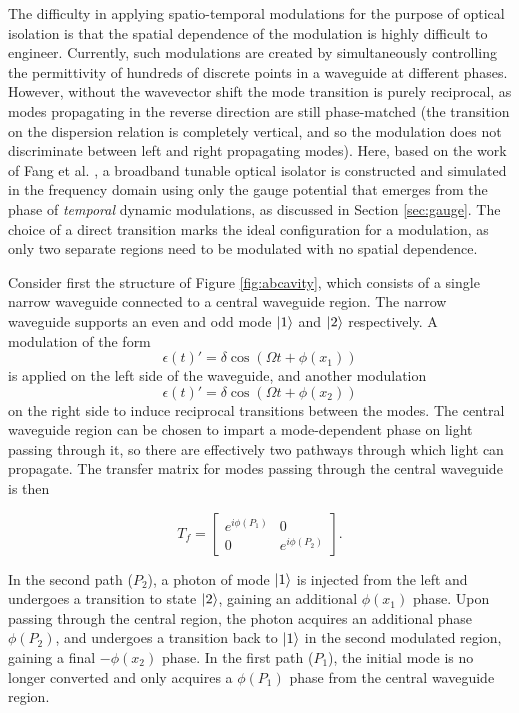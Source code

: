 The difficulty in applying spatio-temporal modulations for the purpose of optical isolation is that the spatial dependence of the modulation is highly difficult to engineer. Currently, such modulations are created by simultaneously controlling the permittivity of hundreds of discrete points in a waveguide at different phases. However, without the wavevector shift the mode transition is purely reciprocal, as modes propagating in the reverse direction are still phase-matched (the transition on the dispersion relation is completely vertical, and so the modulation does not discriminate between left and right propagating modes). Here, based on the work of Fang et al. \cite{Fang2012}, a broadband tunable optical isolator is constructed and simulated in the frequency domain using only the gauge potential that emerges from the phase of \textit{temporal} dynamic modulations, as discussed in Section \ref{sec:gauge}. The choice of a direct transition marks the ideal configuration for a modulation, as only two separate regions need to be modulated with no spatial dependence.

Consider first the structure of Figure \ref{fig:abcavity}, which consists of a single narrow waveguide connected to a central waveguide region. The narrow waveguide supports an even and odd mode $\ket{1}$ and $\ket{2}$ respectively. A modulation of the form
\begin{equation}
\epsilon(t)' = \delta \cos (\Omega t + \phi(x_1))
\end{equation}
is applied on the left side of the waveguide, and another modulation 
\begin{equation}
\epsilon(t)' = \delta \cos (\Omega t + \phi(x_2))
\end{equation}
on the right side to induce reciprocal transitions between the modes. The central waveguide region can be chosen to impart a mode-dependent phase on light passing through it, so there are effectively two pathways through which light can propagate. The transfer matrix for modes passing through the central waveguide is then 

\begin{equation}
T_f =
\begin{bmatrix}
e^{i \phi(P_1)} & 0 \\
0 & e^{i \phi(P_2)} 
\end{bmatrix}.
\end{equation}

In the second path ($P_2$), a photon of mode $\ket{1}$ is injected from the left and undergoes a transition to state $\ket{2}$, gaining an additional $\phi(x_1)$ phase. Upon passing through the central region, the photon acquires an additional phase $\phi(P_2)$, and undergoes a transition back to $\ket{1}$ in the second modulated region, gaining a final $-\phi(x_2)$ phase. In the first path ($P_1$), the initial mode is no longer converted and only acquires a $\phi(P_1)$ phase from the central waveguide region.

